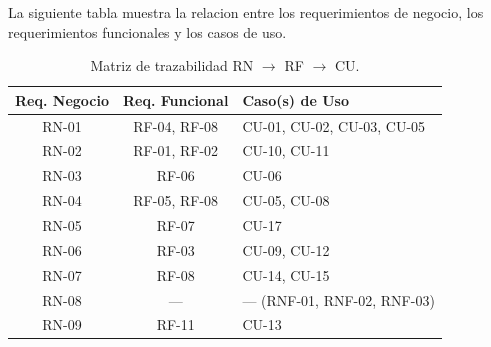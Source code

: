 La siguiente tabla muestra la relacion entre los requerimientos de negocio, los requerimientos funcionales y los casos de uso.

\begin{table}[H]
\centering
\caption{Matriz de trazabilidad RN $\rightarrow$ RF $\rightarrow$ CU.}
\label{tab:trazabilidad}
\small
\begin{tabular}{|c|c|l|}
    \hline
    \textbf{Req. Negocio} & \textbf{Req. Funcional} & \textbf{Caso(s) de Uso} \\
    \hline
    RN-01 & RF-04, RF-08 & CU-01, CU-02, CU-03, CU-05 \\
    \hline
    RN-02 & RF-01, RF-02 & CU-10, CU-11 \\
    \hline
    RN-03 & RF-06 & CU-06 \\
    \hline
    RN-04 & RF-05, RF-08 & CU-05, CU-08 \\
    \hline
    RN-05 & RF-07 & CU-17 \\
    \hline
    RN-06 & RF-03 & CU-09, CU-12 \\
    \hline
    RN-07 & RF-08 & CU-14, CU-15 \\
    \hline
    RN-08 & --- & --- (RNF-01, RNF-02, RNF-03) \\
    \hline
    RN-09 & RF-11 & CU-13 \\
    \hline
\end{tabular}
\end{table}
